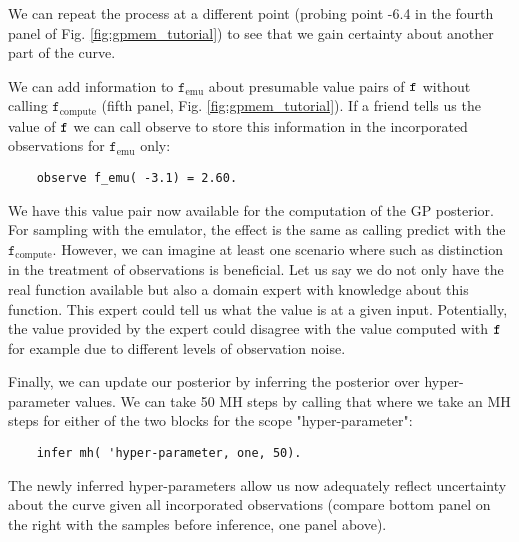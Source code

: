 We can repeat the process at a different point (probing point -6.4 in the fourth panel of Fig. \ref{fig:gpmem_tutorial}) to see that we gain certainty about another part of the curve. 

We can add information to $\texttt{f}_\text{emu}$ about presumable value pairs of $\texttt{f}$ without calling $\texttt{f}_\text{compute}$
(fifth panel, Fig. \ref{fig:gpmem_tutorial}).
If a friend tells us the value of $\texttt{f}$ we can call observe to store this information in the incorporated observations for $\texttt{f}_\text{emu}$ only:
    \begin{lstlisting}
    observe f_emu( -3.1) = 2.60.
    \end{lstlisting}
We have this value pair now available for the computation of the \ac{GP} posterior. 
For sampling with the emulator, the effect is the same as calling predict with the $\texttt{f}_\text{compute}$.
However, we can imagine at least one scenario where such as distinction in the treatment of observations 
is beneficial. Let us say we do not only have the real function available but also a domain expert with knowledge 
about this function.
This expert could tell us what the value is at a given input.
Potentially, the value provided by the expert could disagree with the value computed with $\texttt{f}$ for example 
due to different levels of observation noise. 

Finally, we can update our posterior by inferring the posterior over hyper-parameter values.
We can take 50 \ac{MH} steps by calling that where we take an \ac{MH} steps for either of the two blocks for the scope "hyper-parameter": 
   \begin{lstlisting}
    infer mh( 'hyper-parameter, one, 50).
    \end{lstlisting}
The newly inferred hyper-parameters allow us now adequately reflect uncertainty about the curve given all incorporated observations (compare bottom panel on the right with the samples before inference, one panel above).
